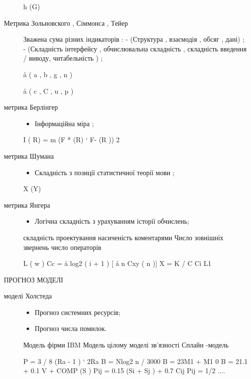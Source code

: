 \begin{description}
h (G)

\item[{Метрика Зольновского , Сіммонса , Тейер}] \leavevmode
Зважена сума різних індикаторів :
- (Структура , взаємодія , обсяг , дані) ;
- (Складність інтерфейсу , обчислювальна складність , складність введення / виводу, читабельність ) ;

å ( a , b , g , n )

å ( c , C , u , p )

\item[{метрика Берлінгер}] \leavevmode\begin{itemize}
\item {} 
Інформаційна міра ;

\end{itemize}

I ( R) = m (F * (R) ` F- (R )) 2

\item[{метрика Шумана}] \leavevmode\begin{itemize}
\item {} 
Складність з позиції статистичної теорії мови ;

\end{itemize}

X (Y)

\item[{метрика Янгера}] \leavevmode\begin{itemize}
\item {} 
Логічна складність з урахуванням історії обчислень;

\end{itemize}

складність проектування
насиченість коментарями
Число зовнішніх звернень
число операторів

L ( w )
Cc = å log2 ( i + 1 ) {[} å n Cxy ( n ){]}
X = K / C
Ci
L1

\end{description}

ПРОГНОЗ МОДЕЛІ
\begin{description}
\item[{моделі Холстеда}] \leavevmode\begin{itemize}
\item {} 
Прогноз системних ресурсів;

\item {} 
Прогноз числа помилок.

\end{itemize}

Модель фірми IBM
Модель цілому
моделі зв'язності
Сплайн -модель

P = 3 / 8 (Ra - 1 ) ` 2Ra
B = Nlog2 n / 3000
B = 23M1 + M1 0
B = 21.1 + 0.1 V + COMP (S )
Pij = 0.15 (Si + Sj ) + 0.7 Cij
Pij = 1/2 ....

\end{description}

